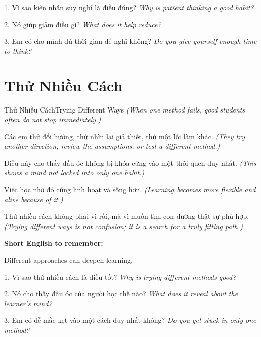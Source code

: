 \begin{tuhocnhanh}
1. Vì sao kiên nhẫn suy nghĩ là điều đúng? \textit{Why is patient thinking a good habit?}

2. Nó giúp giảm điều gì? \textit{What does it help reduce?}

3. Em có cho mình đủ thời gian để nghĩ không? \textit{Do you give yourself enough time to think?}
\end{tuhocnhanh}
\ngancach

\section{Thử Nhiều Cách}
\begin{truyen}{Thử Nhiều Cách}{Trying Different Ways}
\textit{(When one method fails, good students often do not stop immediately.)}

Các em thử đổi hướng, thử nhìn lại giả thiết, thử một lối làm khác.
\textit{(They try another direction, review the assumptions, or test a different method.)}

Điều này cho thấy đầu óc không bị khóa cứng vào một thói quen duy nhất.
\textit{(This shows a mind not locked into only one habit.)}

Việc học nhờ đó cũng linh hoạt và sống hơn.
\textit{(Learning becomes more flexible and alive because of it.)}
\end{truyen}

\begin{baihoc}
Thử nhiều cách không phải vì rối, mà vì muốn tìm con đường thật sự phù hợp.
\textit{(Trying different ways is not confusion; it is a search for a truly fitting path.)}
\end{baihoc}

\begin{ghinhoanh}
\textbf{Short English to remember:}

Different approaches can deepen learning.

\end{ghinhoanh}

\begin{tuhocnhanh}
1. Vì sao thử nhiều cách là điều tốt? \textit{Why is trying different methods good?}

2. Nó cho thấy đầu óc của người học thế nào? \textit{What does it reveal about the learner's mind?}

3. Em có dễ mắc kẹt vào một cách duy nhất không? \textit{Do you get stuck in only one method?}
\end{tuhocnhanh}
\ngancach

